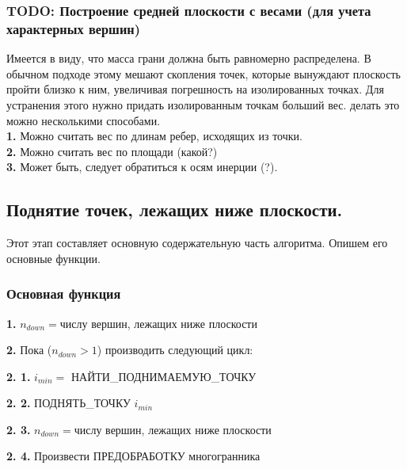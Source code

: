\documentclass[a4paper,12pt, titlepage]{article}
\begin{document}
\subsubsection{TODO: Построение средней плоскости с весами (для учета характерных вершин)}
\begin{flushleft}
Имеется в виду, что масса грани должна быть равномерно распределена. В обычном подходе этому
мешают скопления точек, которые вынуждают плоскость пройти близко к ним, увеличивая погрешность
на изолированных точках. Для устранения этого нужно придать изолированным точкам больший вес.
делать это можно несколькими способами. \\
	\textbf{1. }Можно считать вес по длинам ребер, исходящих из точки.\\
	\textbf{2. }Можно считать вес по площади (какой?)\\
	\textbf{3. }Может быть, следует обратиться к осям инерции (?). 
\end{flushleft}


\subsection{Поднятие точек, лежащих ниже плоскости.}
\begin{flushleft}
 Этот этап составляет основную содержательную часть алгоритма. Опишем его основные функции.
\end{flushleft}

\subsubsection{Основная функция}
\begin{flushleft}
 \textbf{1.} $n_{down} = $числу вершин, лежащих ниже плоскости
\end{flushleft} 
\begin{flushleft}
 \textbf{2.} Пока ($n_{down} > 1$) производить следующий цикл:
\end{flushleft} 
\begin{flushleft}
 \textbf{2. 1.} $i_{min} = $ НАЙТИ\_ПОДНИМАЕМУЮ\_ТОЧКУ
\end{flushleft} 
\begin{flushleft}
 \textbf{2. 2.} ПОДНЯТЬ\_ТОЧКУ $i_{min}$
\end{flushleft} 
\begin{flushleft}
 \textbf{2. 3.} $n_{down} = $числу вершин, лежащих ниже плоскости
\end{flushleft} 
\begin{flushleft}
 \textbf{2. 4.} Произвести ПРЕДОБРАБОТКУ многогранника
\end{flushleft} 
\end{document}
